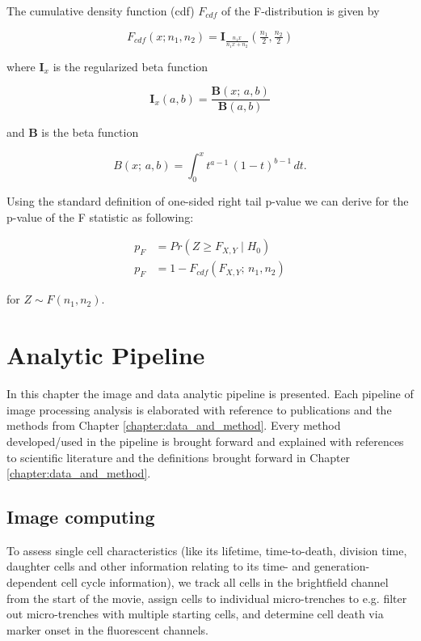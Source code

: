 \documentclass[pdftex,12pt,a4paper]{report}
\begin{document}
The cumulative density function (cdf) $F_{cdf}$ of the F-distribution is given by

\begin{equation}
F_{cdf}(x; n_1, n_2)= \mathbf{I}_{\frac{n_1 x}{n_1 x + n_2}}\left (\tfrac{n_1}{2}, \tfrac{n_2}{2} \right)
\end{equation}

where $\mathbf{I}_x$ is the regularized beta function

\begin{equation}
\mathbf{I}_x(a,b) = \frac{\mathbf{B}(x;\,a,b)}{\mathbf{B}(a,b)}
\end{equation}

and $\mathbf{B}$ is the beta function

\begin{equation}
B(x;\,a,b) = \int_0^x t^{a-1}\,(1-t)^{b-1}\,dt.
\end{equation}

Using the  standard definition of one-sided right tail p-value we can derive for the p-value of the F statistic as following:

\begin{align}
  p_F &= Pr(Z \geq F_{X,Y} \mid H_0) \nonumber \\
  p_F &= 1 - F_{cdf}(F_{X,Y}; \, n_1, n_2)\label{eq:ftest_pval}
\end{align}

for $Z \sim F(n_1, n_2)$.

\chapter{Analytic Pipeline}
\label{chapter:analytic_pipeline}

In this chapter the image and data analytic pipeline is presented. Each pipeline of image processing analysis is elaborated with reference to publications and the methods from Chapter \ref{chapter:data_and_method}.
Every method developed/used in the pipeline is brought forward and explained with references to scientific literature and the definitions brought forward in Chapter \ref{chapter:data_and_method}.

\section{Image computing}

To assess single cell characteristics (like its lifetime, time-to-death, division time, daughter cells and other information relating to its time- and generation-dependent cell cycle information), we track all cells in the brightfield channel from the start of the movie, assign cells to individual micro-trenches to e.g. filter out micro-trenches with multiple starting cells, and determine cell death via marker onset in the fluorescent channels.
\end{document}
